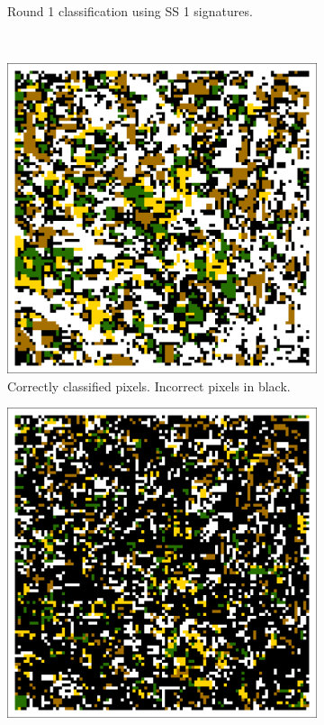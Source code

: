 \begin{Spacing}{1.2}
\begin{figure}
\begin{subfigure}[t]{.475\textwidth}
    \caption{Round 1 classification using SS 1 signatures.}
    \label{subfig:ss1r1class}
  \end{subfigure}
  \\
  \vspace{.25in}
  \begin{subfigure}[b]{.475\textwidth}
    \includegraphics[width=\textwidth]{Graphics/Testing/clip1_MODIS_round1_correct.pdf}
    \caption{Correctly classified pixels. Incorrect pixels in black.}
    \label{subfig:ss1r1correct}
  \end{subfigure}
  \quad
  \begin{subfigure}[b]{.475\textwidth}
    \includegraphics[width=\textwidth]{Graphics/Testing/clip1_MODIS_round1_incorrect.pdf}

\end{subfigure}
\end{figure}
\end{Spacing}
